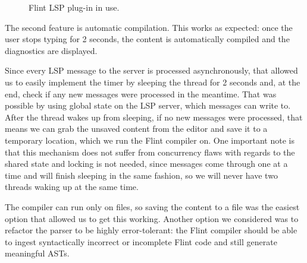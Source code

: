 \begin{figure}[H]
\centering
{}
\caption{Flint LSP plug-in in use.}
\label{lsp-use}
\end{figure}

The second feature is automatic compilation. This works as expected: once the user stops typing for 2 seconds, the content is automatically compiled and the diagnostics are displayed.

Since every LSP message to the server is processed asynchronously, that allowed us to easily implement the timer by sleeping the thread for 2 seconds and, at the end, check if any new messages were processed in the meantime. That was possible by using global state on the LSP server, which messages can write to. After the thread wakes up from sleeping, if no new messages were processed, that means we can grab the unsaved content from the editor and save it to a temporary location, which we run the Flint compiler on. One important note is that this mechanism does not suffer from concurrency flaws with regards to the shared state and locking is not needed, since messages come through one at a time and will finish sleeping in the same fashion, so we will never have two threads waking up at the same time.

The compiler can run only on files, so saving the content to a file was the easiest option that allowed us to get this working. Another option we considered was to refactor the parser to be highly error-tolerant: the Flint compiler should be able to ingest syntactically incorrect or incomplete Flint code and still generate meaningful ASTs. 

